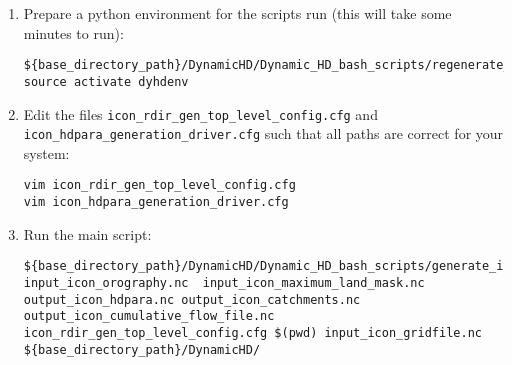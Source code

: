 \documentclass{article}
\begin{document}
\begin{enumerate}
\begin{lstlisting}[style=bash_input,breaklines=true]
cd hdpara_gen_workdir 
scp username@login1.mpimet.mpg.de:/home/mpim/m300468/mk_ic_rdirs/icon_rdir_gen_top_level_config.cfg $(pwd)
scp username@login1.mpimet.mpg.de:/home/mpim/m300468/mk_ic_rdirs/icon_hdpara_generation_driver.cfg $(pwd)
scp username@login1.mpimet.mpg.de:/home/mpim/m300468/mk_ic_rdirs/corrected_orog_intermediary_ICE5G_and_tarasov_upscaled_srtm30plus_north_america_only_data_ALG4_sinkless_glcc_olson_lsmask_0k_20170517_003802.nc $(pwd)
scp username@login1.mpimet.mpg.de:/home/mpim/m300468/mk_ic_rdirs/rdirs_hydrosheds_au_af_sa_upscaled_10min_20200203_163646.nc $(pwd) 
\end{lstlisting}
Note the file \lstinline[style=bash_input]{corrected_orog_intermediary_ICE5G_and_tarasov_upscaled_srtm30plus_north_america_only_data_ALG4_sinkless_glcc_olson_lsmask_0k_20170517_003802.nc} currently lacks grid information. The script has been configured to read this file in the correct orientation. It may require modification if another corrected orography is substituted for this file.
\item Prepare a python environment for the scripts run (this will take some minutes to run):
\begin{lstlisting}[style=bash_input,breaklines=true]
${base_directory_path}/DynamicHD/Dynamic_HD_bash_scripts/regenerate_conda_environment.sh 
source activate dyhdenv
\end{lstlisting}
\item Edit the files \lstinline[style=bash_input]{icon_rdir_gen_top_level_config.cfg} and \lstinline[style=bash_input]{icon_hdpara_generation_driver.cfg} such that all paths are correct for your system:

\begin{lstlisting}[style=bash_input,breaklines=true]
vim icon_rdir_gen_top_level_config.cfg
vim icon_hdpara_generation_driver.cfg 
\end{lstlisting}

\item Run the main script:
\begin{lstlisting}[style=bash_input,breaklines=true]
${base_directory_path}/DynamicHD/Dynamic_HD_bash_scripts/generate_icon_hdpara_top_level_driver.sh input_icon_orography.nc  input_icon_maximum_land_mask.nc  output_icon_hdpara.nc output_icon_catchments.nc output_icon_cumulative_flow_file.nc icon_rdir_gen_top_level_config.cfg $(pwd) input_icon_gridfile.nc ${base_directory_path}/DynamicHD/
\end{lstlisting}
\end{enumerate}
\end{document}
